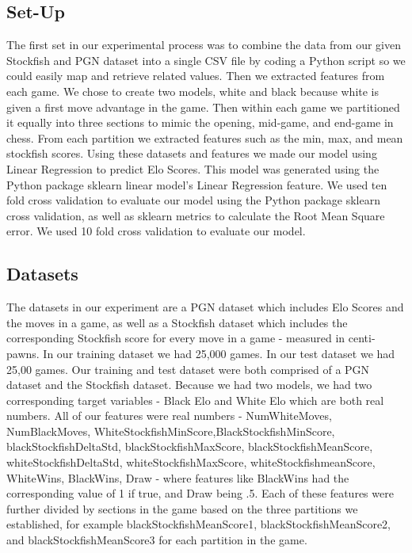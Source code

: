 \documentclass{acm_proc_article-sp}
\begin{document}
\subsection{Set-Up}
The first set in our experimental process was to combine the data from our given Stockfish and PGN dataset into a single CSV file by coding a Python script so we could easily map and retrieve related values. Then we extracted features from each game. We chose to create two models, white and black because white is given a first move advantage in the game. Then within each game we partitioned it equally into three sections to mimic the opening, mid-game, and end-game in chess. From each partition we extracted features such as the min, max, and mean stockfish scores. Using these datasets and features we made our model using Linear Regression to predict Elo Scores. This model was generated using the Python package sklearn linear model’s Linear Regression feature. We used ten fold cross validation to evaluate our model using the Python package sklearn cross validation, as well as sklearn metrics to calculate the Root Mean Square error. We used 10 fold cross validation to evaluate our model.
	
\subsection{Datasets}
The datasets in our experiment are a PGN dataset which includes Elo Scores and the moves in a game, as well as a Stockfish dataset which includes the corresponding Stockfish score for every move in a game - measured in centi-pawns. In our training dataset we had 25,000 games. In our test dataset we had 25,00 games. Our training and test dataset were both comprised of a PGN dataset and the Stockfish dataset. Because we had two models, we had two corresponding target variables - Black Elo and White Elo which are both real numbers. All of our features were real numbers - NumWhiteMoves, NumBlackMoves, WhiteStockfishMinScore,BlackStockfishMinScore,  blackStockfishDeltaStd, blackStockfishMaxScore, blackStockfishMeanScore, whiteStockfishDeltaStd, whiteStockfishMaxScore, whiteStockfishmeanScore, WhiteWins, BlackWins, Draw - where features like BlackWins had the corresponding value of 1 if true, and Draw being .5. Each of these features were further divided by sections in the game based on the three partitions we established, for example blackStockfishMeanScore1, blackStockfishMeanScore2, and blackStockfishMeanScore3 for each partition in the game. 
\end{document}
